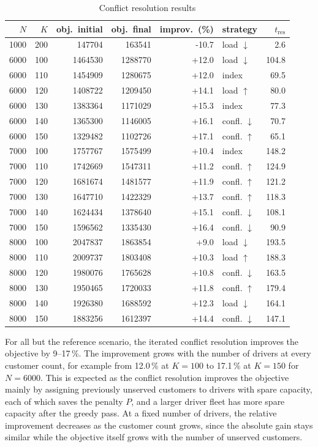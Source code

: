 \begin{table}[H]
\centering
\caption{Conflict resolution results}
\label{tab:resolution}
\small
\begin{tabular}{rrrrrlr}
\toprule
$N$ & $K$ & obj.\ initial & obj.\ final & improv.\ (\%) & strategy & $t_{\text{res}}$ \\
\midrule
1000 & 200 & 147704 & 163541 & -10.7 & load $\downarrow$ & 2.6 \\
6000 & 100 & 1464530 & 1288770 & +12.0 & load $\downarrow$ & 104.8 \\
6000 & 110 & 1454909 & 1280675 & +12.0 & index & 69.5 \\
6000 & 120 & 1408722 & 1209450 & +14.1 & load $\uparrow$ & 80.0 \\
6000 & 130 & 1383364 & 1171029 & +15.3 & index & 77.3 \\
6000 & 140 & 1365300 & 1146005 & +16.1 & confl. $\downarrow$ & 70.7 \\
6000 & 150 & 1329482 & 1102726 & +17.1 & confl. $\uparrow$ & 65.1 \\
7000 & 100 & 1757767 & 1575499 & +10.4 & index & 148.2 \\
7000 & 110 & 1742669 & 1547311 & +11.2 & confl. $\uparrow$ & 124.9 \\
7000 & 120 & 1681674 & 1481577 & +11.9 & confl. $\uparrow$ & 121.2 \\
7000 & 130 & 1647710 & 1422329 & +13.7 & confl. $\uparrow$ & 118.3 \\
7000 & 140 & 1624434 & 1378640 & +15.1 & confl. $\downarrow$ & 108.1 \\
7000 & 150 & 1596562 & 1335430 & +16.4 & confl. $\downarrow$ & 90.9 \\
8000 & 100 & 2047837 & 1863854 & +9.0 & load $\downarrow$ & 193.5 \\
8000 & 110 & 2009737 & 1803408 & +10.3 & load $\uparrow$ & 188.3 \\
8000 & 120 & 1980076 & 1765628 & +10.8 & confl. $\downarrow$ & 163.5 \\
8000 & 130 & 1950465 & 1720033 & +11.8 & confl. $\uparrow$ & 179.4 \\
8000 & 140 & 1926380 & 1688592 & +12.3 & load $\downarrow$ & 164.1 \\
8000 & 150 & 1883256 & 1612397 & +14.4 & confl. $\downarrow$ & 147.1 \\
\bottomrule
\end{tabular}
\end{table}

For all but the reference scenario, the iterated conflict resolution improves the objective by 9–17\,\%. The improvement grows with the number of drivers at every customer count, for example from 12.0\,\% at $K = 100$ to 17.1\,\% at $K = 150$ for $N = 6000$. This is expected as the conflict resolution improves the objective mainly by assigning previously unserved customers to drivers with spare capacity, each of which saves the penalty $P$, and a larger driver fleet has more spare capacity after the greedy pass. At a fixed number of drivers, the relative improvement decreases as the customer count grows, since the absolute gain stays similar while the objective itself grows with the number of unserved customers.

